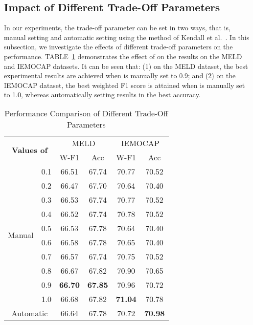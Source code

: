 \documentclass[journal]{IEEEtran}
\begin{document}
\subsection{Impact of Different Trade-Off Parameters}
In our experiments, the trade-off parameter  can be set in two ways, that is, manual setting and automatic setting using the method of Kendall et al.~\cite{kendall2018multi}. In this subsection, we investigate the effects of different trade-off parameters on the performance. TABLE~\ref{tab:trade-off} demonstrates the effect of  on the results on the MELD and IEMOCAP datasets. It can be seen that: (1) on the MELD dataset, the best experimental results are achieved when  is manually set to 0.9; and (2) on the IEMOCAP dataset, the best weighted F1 score is attained when  is manually set to 1.0, whereas automatically setting  results in the best accuracy.
\begin{table}[htbp]
    \centering
    \renewcommand{\arraystretch}{1.0}
    \setlength{\tabcolsep}{9pt}
    \caption{Performance Comparison of Different Trade-Off Parameters}
\begin{tabular}{cc|cc|cc}
    \hline
    \multicolumn{2}{c|}{\multirow{2}{*}{\textbf{Values of }}} &\multicolumn{2}{c|}{MELD} &\multicolumn{2}{c}{IEMOCAP}\\ 
& &W-F1 &Acc &W-F1 &Acc\\ 
    \hline 
	\multicolumn{1}{c|}{\multirow{10}{*}{Manual}} & 0.1 &66.51 &67.74 &70.77 &70.52 \\
    \multicolumn{1}{c|}{}& 0.2 &66.47 &67.70 &70.64 &70.40 \\
	\multicolumn{1}{c|}{}& 0.3 &66.53 &67.74 &70.77 &70.52 \\
	\multicolumn{1}{c|}{}& 0.4 &66.52 &67.74 &70.78 &70.52 \\
	\multicolumn{1}{c|}{}& 0.5 &66.53 &67.78 &70.64 &70.40 \\
	\multicolumn{1}{c|}{}& 0.6 &66.58 &67.78 &70.65 &70.40 \\
	\multicolumn{1}{c|}{}& 0.7 &66.57 &67.74 &70.75 &70.52 \\
	\multicolumn{1}{c|}{}& 0.8 &66.67 &67.82 &70.90 &70.65 \\
    \multicolumn{1}{c|}{}& 0.9 &\textbf{66.70} &\textbf{67.85} &70.96 &70.72 \\
	\multicolumn{1}{c|}{}& 1.0 &66.68 &67.82 &\textbf{71.04} &70.78 \\
	\hline
	\multicolumn{2}{c|}{Automatic} &66.64 &67.78 &70.72 &\textbf{70.98}\\
	\hline
    \end{tabular}
\label{tab:trade-off}
\end{table}
\end{document}
